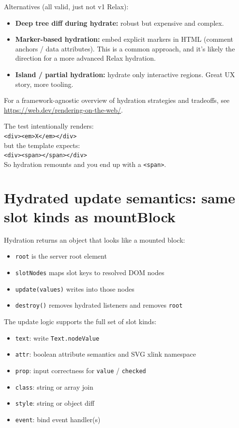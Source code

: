 Alternatives (all valid, just not v1 Relax):

\begin{itemize}
  \item \textbf{Deep tree diff during hydrate:} robust but expensive and complex.
  \item \textbf{Marker-based hydration:} embed explicit markers in HTML (comment anchors / data attributes). This is a common approach, and it’s likely the direction for a more advanced Relax hydration.
  \item \textbf{Island / partial hydration:} hydrate only interactive regions. Great UX story, more tooling.
\end{itemize}

For a framework-agnostic overview of hydration strategies and tradeoffs, see \href{https://web.dev/rendering-on-the-web/}{https://web.dev/rendering-on-the-web/}.

The test intentionally renders:\\
\texttt{<div><em>X</em></div>}\\
but the template expects:\\
\texttt{<div><span></span></div>}\\
So hydration remounts and you end up with a \texttt{<span>}.

\section{Hydrated update semantics: same slot kinds as mountBlock}

Hydration returns an object that looks like a mounted block:

\begin{itemize}
  \item \texttt{root} is the server root element
  \item \texttt{slotNodes} maps slot keys to resolved DOM nodes
  \item \texttt{update(values)} writes into those nodes
  \item \texttt{destroy()} removes hydrated listeners and removes \texttt{root}
\end{itemize}

The update logic supports the full set of slot kinds:

\begin{itemize}
  \item \texttt{text}: write \texttt{Text.nodeValue}
  \item \texttt{attr}: boolean attribute semantics and SVG xlink namespace
  \item \texttt{prop}: input correctness for \texttt{value} / \texttt{checked}
  \item \texttt{class}: string or array join
  \item \texttt{style}: string or object diff
  \item \texttt{event}: bind event handler(s)
\end{itemize}

